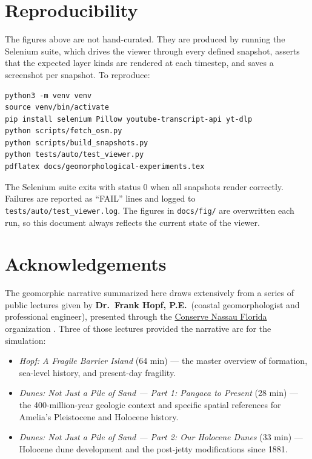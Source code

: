 \documentclass[11pt]{article}
\begin{document}
\section{Reproducibility}

The figures above are not hand-curated. They are produced by running the
Selenium suite, which drives the viewer through every defined snapshot,
asserts that the expected layer kinds are rendered at each timestep, and
saves a screenshot per snapshot. To reproduce:

\begin{Verbatim}[fontsize=\small]
python3 -m venv venv
source venv/bin/activate
pip install selenium Pillow youtube-transcript-api yt-dlp
python scripts/fetch_osm.py
python scripts/build_snapshots.py
python tests/auto/test_viewer.py
pdflatex docs/geomorphological-experiments.tex
\end{Verbatim}

\noindent The Selenium suite exits with status 0 when all snapshots render
correctly. Failures are reported as ``FAIL'' lines and logged to
\texttt{tests/auto/test\_viewer.log}. The figures in
\texttt{docs/fig/} are overwritten each run, so this document always
reflects the current state of the viewer.

\section{Acknowledgements}

The geomorphic narrative summarized here draws extensively from a series of
public lectures given by \textbf{Dr.\ Frank Hopf, P.E.}\ (coastal
geomorphologist and professional engineer), presented through the
\href{https://www.youtube.com/@conservenassauflorida}{Conserve Nassau Florida}
organization \cite{cn_channel}. Three of those lectures provided the
narrative arc for the simulation:

\begin{itemize}[leftmargin=2em]
\item \emph{Hopf: A Fragile Barrier Island} (64 min) \cite{cn_hopf} ---
the master overview of formation, sea-level history, and present-day
fragility.
\item \emph{Dunes: Not Just a Pile of Sand --- Part 1: Pangaea to Present}
(28 min) \cite{cn_dunes1} --- the 400-million-year geologic context and
specific spatial references for Amelia's Pleistocene and Holocene history.
\item \emph{Dunes: Not Just a Pile of Sand --- Part 2: Our Holocene Dunes}
(33 min) \cite{cn_dunes2} --- Holocene dune development and the post-jetty
modifications since 1881.
\end{itemize}
\end{document}

